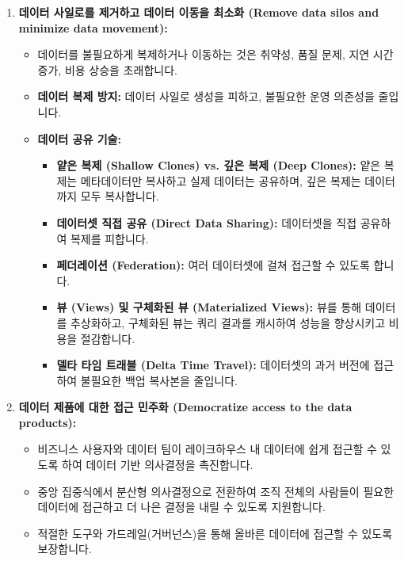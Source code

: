 \documentclass[11pt,a4paper]{article}
\begin{document}
\begin{enumerate}
    \item \textbf{데이터 사일로를 제거하고 데이터 이동을 최소화 (Remove data silos and minimize data movement):}
    \begin{itemize}
        \item 데이터를 불필요하게 복제하거나 이동하는 것은 취약성, 품질 문제, 지연 시간 증가, 비용 상승을 초래합니다.
        \item \textbf{데이터 복제 방지:} 데이터 사일로 생성을 피하고, 불필요한 운영 의존성을 줄입니다.
        \item \textbf{데이터 공유 기술:}
        \begin{itemize}
            \item \textbf{얕은 복제 (Shallow Clones) vs. 깊은 복제 (Deep Clones):} 얕은 복제는 메타데이터만 복사하고 실제 데이터는 공유하며, 깊은 복제는 데이터까지 모두 복사합니다.
            \item \textbf{데이터셋 직접 공유 (Direct Data Sharing):} 데이터셋을 직접 공유하여 복제를 피합니다.
            \item \textbf{페더레이션 (Federation):} 여러 데이터셋에 걸쳐 접근할 수 있도록 합니다.
            \item \textbf{뷰 (Views) 및 구체화된 뷰 (Materialized Views):} 뷰를 통해 데이터를 추상화하고, 구체화된 뷰는 쿼리 결과를 캐시하여 성능을 향상시키고 비용을 절감합니다.
            \item \textbf{델타 타임 트래블 (Delta Time Travel):} 데이터셋의 과거 버전에 접근하여 불필요한 백업 복사본을 줄입니다.
        \end{itemize}
    \end{itemize}

    \item \textbf{데이터 제품에 대한 접근 민주화 (Democratize access to the data products):}
    \begin{itemize}
        \item 비즈니스 사용자와 데이터 팀이 레이크하우스 내 데이터에 쉽게 접근할 수 있도록 하여 데이터 기반 의사결정을 촉진합니다.
        \item 중앙 집중식에서 분산형 의사결정으로 전환하여 조직 전체의 사람들이 필요한 데이터에 접근하고 더 나은 결정을 내릴 수 있도록 지원합니다.
        \item 적절한 도구와 가드레일(거버넌스)을 통해 올바른 데이터에 접근할 수 있도록 보장합니다.
    \end{itemize}


\end{enumerate}
\end{document}
